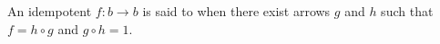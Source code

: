 An idempotent $f: b \rightarrow b$ is said to  when there exist arrows $g$ and $h$ such that $f = h \circ g$ and $g \circ h = 1$.
